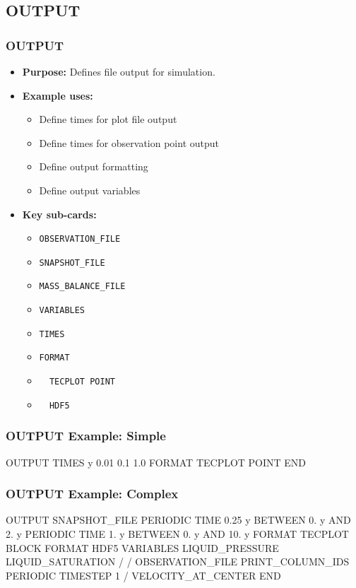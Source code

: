 \subsection{OUTPUT}

\begin{frame}\frametitle{OUTPUT}

\begin{itemize}
\item[] \textbf{Purpose:} Defines file output for simulation.
\item[] \textbf{Example uses:}
\begin{itemize}
  \item Define times for plot file output
  \item Define times for observation point output
  \item Define output formatting
  \item Define output variables
\end{itemize}
\item[] \textbf{Key sub-cards:}
\begin{itemize}
  \item[] \verb|OBSERVATION_FILE|
  \item[] \verb|SNAPSHOT_FILE|
  \item[] \verb|MASS_BALANCE_FILE|
  \item[] \verb|VARIABLES|
  \item[] \verb|TIMES|
  \item[] \verb|FORMAT|
  \item[] \verb|  TECPLOT POINT|
  \item[] \verb|  HDF5|
\end{itemize}
\end{itemize}

\end{frame}

\begin{frame}[fragile]\frametitle{OUTPUT Example: Simple}

\begin{semiverbatim}
OUTPUT
  TIMES y 0.01 0.1 1.0
  FORMAT TECPLOT POINT
END
\end{semiverbatim}

\end{frame}

\begin{frame}[fragile]\frametitle{OUTPUT Example: Complex}

\begin{semiverbatim}
OUTPUT
  SNAPSHOT_FILE
    PERIODIC TIME 0.25 y BETWEEN 0. y AND 2. y
    PERIODIC TIME 1. y BETWEEN 0. y AND 10. y
    FORMAT TECPLOT BLOCK
    FORMAT HDF5
    VARIABLES
      LIQUID_PRESSURE
      LIQUID_SATURATION
    /
  /
  OBSERVATION_FILE
    PRINT_COLUMN_IDS
    PERIODIC TIMESTEP 1
  /
  VELOCITY_AT_CENTER
END
\end{semiverbatim}

\end{frame}
